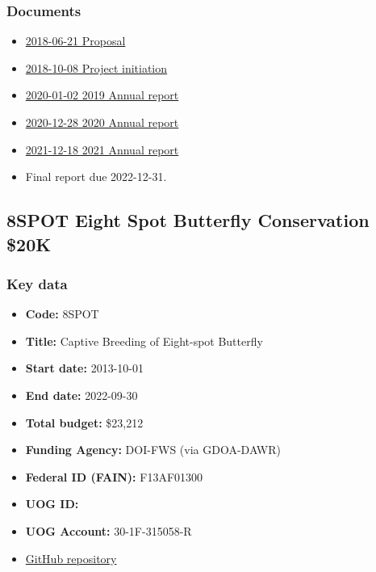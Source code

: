 \subsubsection{Documents}
\begin{itemize}
	\setlength\itemsep{0em}	
	\item \href{https://github.com/aubreymoore/McIntire-Stennis/raw/master/MS_Project_Proposal_2018/ms_proposal_2018.pdf}{2018-06-21 Proposal}
	\item \href{https://github.com/aubreymoore/McIntire-Stennis/raw/master/project_initiation.pdf}{2018-10-08 Project initiation}
	\item \href{https://github.com/aubreymoore/McIntire-Stennis/raw/master/2019-report.pdf}{2020-01-02 2019 Annual report}
	\item \href{https://github.com/aubreymoore/McIntire-Stennis/raw/master/2020\%20Annual\%20Report/2020\%20McS\%20Annual\%20Report.pdf}{2020-12-28 2020 Annual report}
	\item \href{https://github.com/aubreymoore/McIntire-Stennis/raw/master/2021\%20Annual\%20Report/submitted_for_review.pdf}{2021-12-18 2021 Annual report}
	\item Final report due 2022-12-31.
\end{itemize}





\newpage
\subsection{8SPOT Eight Spot Butterfly Conservation \$20K}
\label{8SPOT}
\subsubsection{Key data}
\begin{itemize}
	\setlength\itemsep{0em}
	\item \textbf{Code:} 8SPOT
	\item \textbf{Title:} Captive Breeding of Eight-spot Butterfly
	\item \textbf{Start date:} 2013-10-01
	\item \textbf{End date:} 2022-09-30
	\item \textbf{Total budget:} \$23,212
	\item \textbf{Funding Agency:} DOI-FWS (via GDOA-DAWR)
	\item \textbf{Federal ID (FAIN):} F13AF01300
	\item \textbf{UOG ID:}
	\item \textbf{UOG Account:} 30-1F-315058-R
	\item \href{https://github.com/aubreymoore/Hypollimnas-octocula-conservation}{GitHub repository}
\end{itemize}


